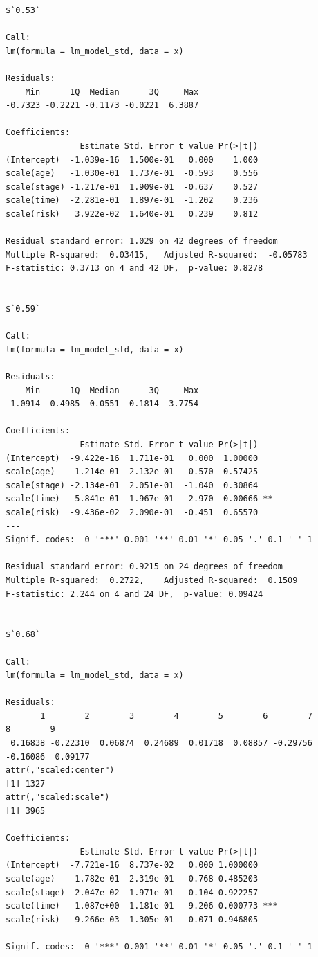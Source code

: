 \documentclass[]{revtex4}\usepackage[]{graphicx}\usepackage[]{color}
\makeatletter
\newenvironment{kframe}{%
 \def\at@end@of@kframe{}%
 \ifinner\ifhmode%
  \def\at@end@of@kframe{\end{minipage}}%
  \begin{minipage}{\columnwidth}%
 \fi\fi%
 \def\FrameCommand##1{\hskip\@totalleftmargin \hskip-\fboxsep
 \colorbox{shadecolor}{##1}\hskip-\fboxsep
     \hskip-\linewidth \hskip-\@totalleftmargin \hskip\columnwidth}%
 \MakeFramed {\advance\hsize-\width
   \@totalleftmargin\z@ \linewidth\hsize
   \@setminipage}}%
 {\par\unskip\endMakeFramed%
 \at@end@of@kframe}
\newenvironment{knitrout}{}{} %
\makeatother
\begin{document}
\begin{enumerate}
\begin{knitrout}
\begin{kframe}
\begin{verbatim}
$`0.53`

Call:
lm(formula = lm_model_std, data = x)

Residuals:
    Min      1Q  Median      3Q     Max 
-0.7323 -0.2221 -0.1173 -0.0221  6.3887 

Coefficients:
               Estimate Std. Error t value Pr(>|t|)
(Intercept)  -1.039e-16  1.500e-01   0.000    1.000
scale(age)   -1.030e-01  1.737e-01  -0.593    0.556
scale(stage) -1.217e-01  1.909e-01  -0.637    0.527
scale(time)  -2.281e-01  1.897e-01  -1.202    0.236
scale(risk)   3.922e-02  1.640e-01   0.239    0.812

Residual standard error: 1.029 on 42 degrees of freedom
Multiple R-squared:  0.03415,	Adjusted R-squared:  -0.05783 
F-statistic: 0.3713 on 4 and 42 DF,  p-value: 0.8278


$`0.59`

Call:
lm(formula = lm_model_std, data = x)

Residuals:
    Min      1Q  Median      3Q     Max 
-1.0914 -0.4985 -0.0551  0.1814  3.7754 

Coefficients:
               Estimate Std. Error t value Pr(>|t|)   
(Intercept)  -9.422e-16  1.711e-01   0.000  1.00000   
scale(age)    1.214e-01  2.132e-01   0.570  0.57425   
scale(stage) -2.134e-01  2.051e-01  -1.040  0.30864   
scale(time)  -5.841e-01  1.967e-01  -2.970  0.00666 **
scale(risk)  -9.436e-02  2.090e-01  -0.451  0.65570   
---
Signif. codes:  0 '***' 0.001 '**' 0.01 '*' 0.05 '.' 0.1 ' ' 1

Residual standard error: 0.9215 on 24 degrees of freedom
Multiple R-squared:  0.2722,	Adjusted R-squared:  0.1509 
F-statistic: 2.244 on 4 and 24 DF,  p-value: 0.09424


$`0.68`

Call:
lm(formula = lm_model_std, data = x)

Residuals:
       1        2        3        4        5        6        7        8        9 
 0.16838 -0.22310  0.06874  0.24689  0.01718  0.08857 -0.29756 -0.16086  0.09177 
attr(,"scaled:center")
[1] 1327
attr(,"scaled:scale")
[1] 3965

Coefficients:
               Estimate Std. Error t value Pr(>|t|)    
(Intercept)  -7.721e-16  8.737e-02   0.000 1.000000    
scale(age)   -1.782e-01  2.319e-01  -0.768 0.485203    
scale(stage) -2.047e-02  1.971e-01  -0.104 0.922257    
scale(time)  -1.087e+00  1.181e-01  -9.206 0.000773 ***
scale(risk)   9.266e-03  1.305e-01   0.071 0.946805    
---
Signif. codes:  0 '***' 0.001 '**' 0.01 '*' 0.05 '.' 0.1 ' ' 1


\end{verbatim}
\end{kframe}
\end{knitrout}
\end{enumerate}
\end{document}
